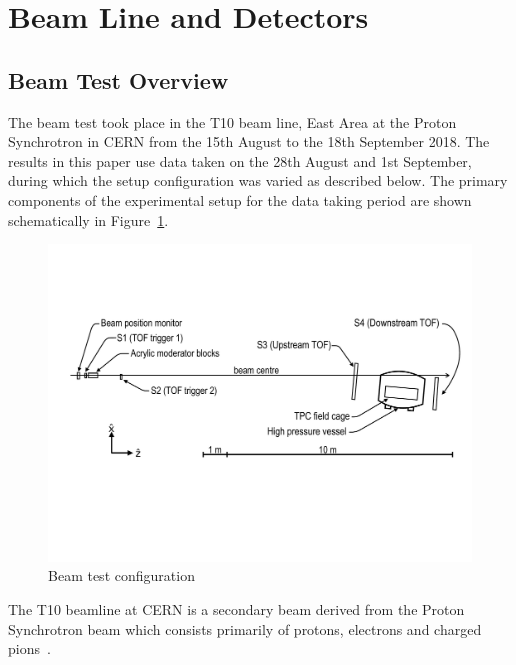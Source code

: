 \section{Beam Line and Detectors}
\label{hptpcPaper:sec:Methods}

\subsection{Beam Test Overview}
The beam test took place in the T10 beam line, East Area at the Proton Synchrotron in CERN from the 15th August to the 18th September 2018.
The results in this paper use data taken on the 28th August and 1st September, during which the setup configuration was varied as described below.
The primary components of the  experimental setup for the data taking period are shown schematically in Figure~\ref{fig:setup}.

\begin{figure}
  \includegraphics[width=1.0\linewidth]{files/Figures/hptpc_t10_planview.pdf}
  \caption{Beam test configuration}
  \label{fig:setup}
\end{figure}

The T10 beamline at CERN is a secondary beam derived from the Proton Synchrotron beam which consists primarily of protons, electrons and charged pions~\cite{T10Report}.

